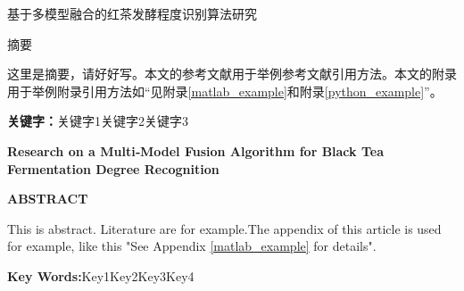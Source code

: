 \phantom{空一行}
\vspace{-2em} %
\begin{center}
	\heiti
	基于多模型融合的红茶发酵程度识别算法研究
\end{center}

\begin{center}
	\heiti
	摘要
\end{center}

\vspace{0.5em} %

这里是摘要，请好好写。本文的参考文献用于举例参考文献引用方法\cite{DP图像分类综述}。本文的附录用于举例附录引用方法如“见附录\ref{matlab_example}和附录\ref{python_example}”。

\vspace{1em}  

\noindent
\textbf{关键字：}关键字1\quad 关键字2\quad 关键字3
\newpage

\phantom{空一行}
\vspace{-2em} %
\begin{center}
	\bfseries
	\rmfamily Research on a Multi‑Model Fusion Algorithm for Black Tea Fermentation Degree Recognition
\end{center}

\begin{center}
	\rmfamily\bfseries
	ABSTRACT
\end{center}

\vspace{0.5em}  %

This is abstract. Literature are for example\cite{DP图像分类综述}.The appendix of this article is used for example, like this "See Appendix \ref{matlab_example} for details".

\vspace{1em}

\noindent\textbf{Key Words:}\quad Key1\quad Key2\quad Key3\quad Key4
